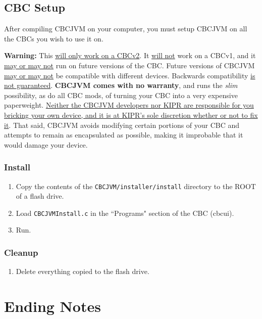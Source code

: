 \documentclass[12pt,letterpaper]{article}
\begin{document}
\subsection{CBC Setup}

After compiling CBCJVM on your computer, you must setup CBCJVM on all the CBCs you wish to use it on.

\textbf{Warning:} This \uline{will only work on a CBCv2}. It \uline{will not} work on a CBCv1, and it \uline{may or may not} run on future versions of the CBC. Future versions of CBCJVM \uline{may or may not} be compatible with different devices. Backwards compatibility \uline{is not guaranteed}. \textbf{CBCJVM comes with no warranty}, and runs the \emph{slim} possibility, as do all CBC mods, of turning your CBC into a very expensive paperweight. \uline{Neither the CBCJVM developers nor KIPR are responsible for you bricking your own device, and it is at KIPR's sole discretion whether or not to fix it}. That said, CBCJVM avoids modifying certain portions of your CBC and attempts to remain as encapsulated as possible, making it improbable that it would damage your device.



\subsubsection{Install}

\begin{enumerate}
\item Copy the contents of the \texttt{CBCJVM/installer/install} directory to the ROOT of a flash drive.
\item Load \texttt{CBCJVMInstall.c} in the ``Programs" section of the CBC (cbcui).
\item Run.
\end{enumerate}



\subsubsection{Cleanup}

\begin{enumerate}
\item Delete everything copied to the flash drive.
\end{enumerate}



\pagebreak
\section{Ending Notes}
\end{document}
